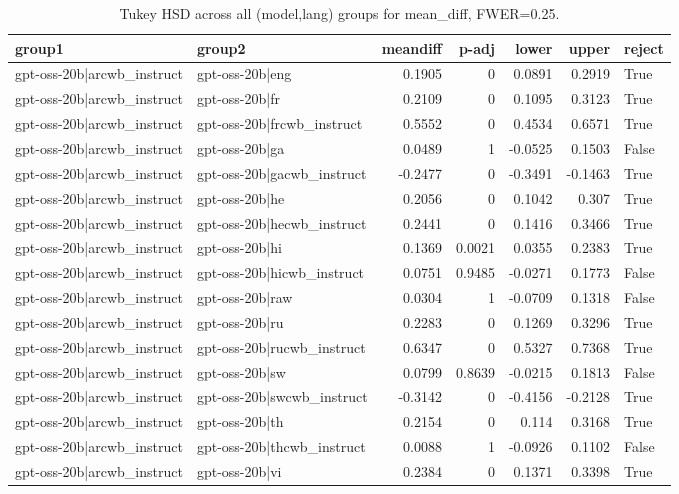 \begin{table}
\caption{Tukey HSD across all (model,lang) groups for mean_diff, FWER=0.25.}
\label{tab:tukey_all_models_all_langs_mean_diff}
\begin{tabular}{l l r r r r l}
\toprule
group1 & group2 & meandiff & p-adj & lower & upper & reject \\
\midrule
gpt-oss-20b|arcwb_instruct & gpt-oss-20b|eng & 0.1905 & 0 & 0.0891 & 0.2919 & True \\
gpt-oss-20b|arcwb_instruct & gpt-oss-20b|fr & 0.2109 & 0 & 0.1095 & 0.3123 & True \\
gpt-oss-20b|arcwb_instruct & gpt-oss-20b|frcwb_instruct & 0.5552 & 0 & 0.4534 & 0.6571 & True \\
gpt-oss-20b|arcwb_instruct & gpt-oss-20b|ga & 0.0489 & 1 & -0.0525 & 0.1503 & False \\
gpt-oss-20b|arcwb_instruct & gpt-oss-20b|gacwb_instruct & -0.2477 & 0 & -0.3491 & -0.1463 & True \\
gpt-oss-20b|arcwb_instruct & gpt-oss-20b|he & 0.2056 & 0 & 0.1042 & 0.307 & True \\
gpt-oss-20b|arcwb_instruct & gpt-oss-20b|hecwb_instruct & 0.2441 & 0 & 0.1416 & 0.3466 & True \\
gpt-oss-20b|arcwb_instruct & gpt-oss-20b|hi & 0.1369 & 0.0021 & 0.0355 & 0.2383 & True \\
gpt-oss-20b|arcwb_instruct & gpt-oss-20b|hicwb_instruct & 0.0751 & 0.9485 & -0.0271 & 0.1773 & False \\
gpt-oss-20b|arcwb_instruct & gpt-oss-20b|raw & 0.0304 & 1 & -0.0709 & 0.1318 & False \\
gpt-oss-20b|arcwb_instruct & gpt-oss-20b|ru & 0.2283 & 0 & 0.1269 & 0.3296 & True \\
gpt-oss-20b|arcwb_instruct & gpt-oss-20b|rucwb_instruct & 0.6347 & 0 & 0.5327 & 0.7368 & True \\
gpt-oss-20b|arcwb_instruct & gpt-oss-20b|sw & 0.0799 & 0.8639 & -0.0215 & 0.1813 & False \\
gpt-oss-20b|arcwb_instruct & gpt-oss-20b|swcwb_instruct & -0.3142 & 0 & -0.4156 & -0.2128 & True \\
gpt-oss-20b|arcwb_instruct & gpt-oss-20b|th & 0.2154 & 0 & 0.114 & 0.3168 & True \\
gpt-oss-20b|arcwb_instruct & gpt-oss-20b|thcwb_instruct & 0.0088 & 1 & -0.0926 & 0.1102 & False \\
gpt-oss-20b|arcwb_instruct & gpt-oss-20b|vi & 0.2384 & 0 & 0.1371 & 0.3398 & True \\

\end{tabular}
\end{table}
